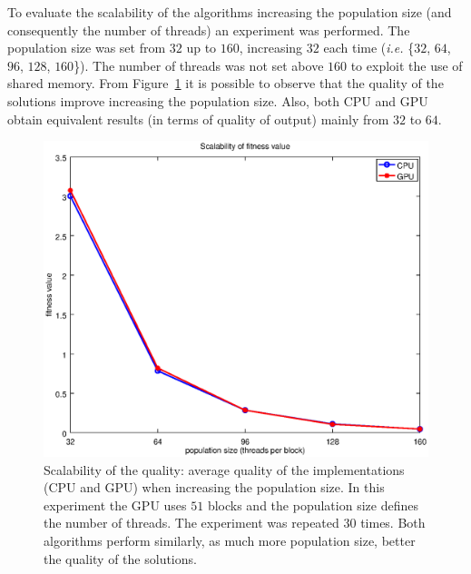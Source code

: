 \documentclass{article}
\begin{document}
    To evaluate the scalability of the algorithms increasing the population size (and consequently the number of threads) an experiment was performed.
    The population size was set from $32$ up to $160$, increasing $32$ each time ({\it i.e.} \{$32$, $64$, $96$, $128$, $160$\}). The number of threads was not set above $160$ to exploit the use of shared memory. From Figure~\ref{fig:scalability_schafferf7} it is possible to observe that the quality of the solutions improve increasing the population size. Also, both CPU and GPU obtain equivalent results (in terms of quality of output) mainly from $32$ to $64$.

    \begin{figure}[!htb]
        \centering
        \includegraphics[width=.7\textwidth]{../img/scalability_schafferf7.eps}
        \caption{Scalability of the quality: average quality of the implementations (CPU and GPU) when increasing the population size. In this experiment the GPU uses $51$ blocks and the population size defines the number of threads. The experiment was repeated $30$ times. Both algorithms perform similarly, as much more population size, better the quality of the solutions.}
        \label{fig:scalability_schafferf7}
    \end{figure}
\end{document}

